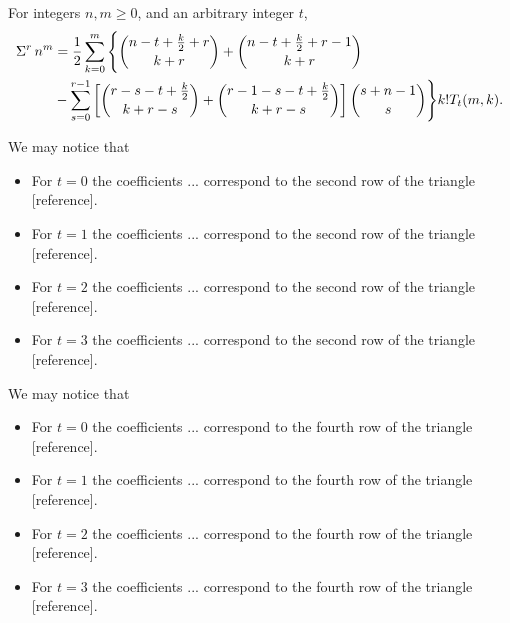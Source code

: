 
\begin{proposition}
  \label{prop:multifold-central-factorial-sums-of-powers}
  For integers $n,m \geq 0$, and an arbitrary integer $t$,
  \begin{align*}
    \Sigma^{r}\,{n}^{m}
    &= \frac{1}{2} \sum_{k=0}^{m}
    \Bigg \{
      \binom{n-t+\frac{k}{2}+r}{k+r} + \binom{n-t+\frac{k}{2}+r-1}{k+r} \\
      &-
      \sum_{s=0}^{r-1}
      \left[
        \binom{r-s-t+\frac{k}{2}}{k+r-s} + \binom{r-1-s-t+\frac{k}{2}}{k+r-s}
      \right] \binom{s+n-1}{s}
    \Bigg \} k! T_t(m,k).
  \end{align*}
\end{proposition}




We may notice that
\begin{itemize}
  \item For $t=0$ the coefficients $...$ correspond to the second row of the triangle [reference].
  \item For $t=1$ the coefficients $...$ correspond to the second row of the triangle [reference].
  \item For $t=2$ the coefficients $...$ correspond to the second row of the triangle [reference].
  \item For $t=3$ the coefficients $...$ correspond to the second row of the triangle [reference].
\end{itemize}


We may notice that
\begin{itemize}
  \item For $t=0$ the coefficients $...$ correspond to the fourth row of the triangle [reference].
  \item For $t=1$ the coefficients $...$ correspond to the fourth row of the triangle [reference].
  \item For $t=2$ the coefficients $...$ correspond to the fourth row of the triangle [reference].
  \item For $t=3$ the coefficients $...$ correspond to the fourth row of the triangle [reference].
\end{itemize}
